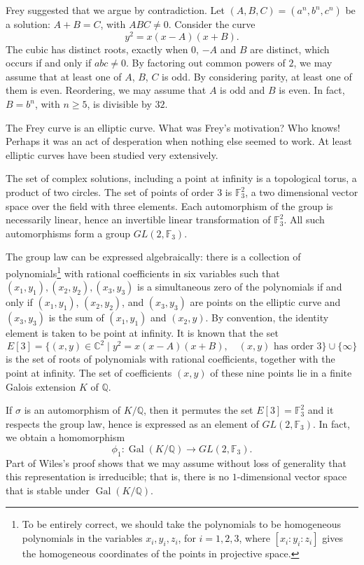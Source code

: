 \documentclass{amsart}
\def\op#1{{\operatorname{#1}}}
\newcommand{\ring}[1]{\mathbb{#1}}
\begin{document}
Frey suggested that we argue by contradiction.  Let
$(A,B,C)=(a^n,b^n,c^n)$ be a solution: $A+B=C$, with $ABC\ne
0$. Consider the curve
\[
y^2 = x (x - A) (x + B).
\]
The cubic has distinct roots, exactly when $0$, $-A$ and $B$ are
distinct, which occurs if and only if $abc\ne 0$.  By factoring out
common powers of $2$, we may assume that at least one of $A$, $B$, $C$
is odd.  By considering parity, at least one of them is even.
Reordering, we may assume that $A$ is odd and $B$ is even.  In fact,
$B=b^n$, with $n\ge 5$, is divisible by $32$.


The Frey curve is an elliptic curve.  What was Frey's motivation?  Who
knows! Perhaps it was an act of desperation when nothing else seemed
to work. At least elliptic curves have been studied very extensively.

The set of complex solutions, including a point at infinity is a
topological torus, a product of two circles.  The set of points of
order $3$ is $\ring{F}_3^2$, a two dimensional vector space over the
field with three elements.  Each automorphism of the group is
necessarily linear, hence an invertible linear transformation of
$\ring{F}^2_3$.  All such automorphisms form a group
$GL(2,\ring{F}_3)$.

The group law can be expressed algebraically: there is a collection of
polynomials\footnote{To be entirely correct, we should take the
  polynomials to be homogeneous polynomials in the variables
  $x_i,y_i,z_i$, for $i=1,2,3$, where $[x_i:y_i:z_i]$ gives the
  homogeneous coordinates of the points in projective space.}  with
rational coefficients in six variables such that
$(x_1,y_1),(x_2,y_2),(x_3,y_3)$ is a simultaneous zero of the
polynomials if and only if $(x_1,y_1)$, $(x_2,y_2)$, and $(x_3,y_3)$
are points on the elliptic curve and $(x_3,y_3)$ is the sum of
$(x_1,y_1)$ and $(x_2,y)$.  By convention, the identity element is
taken to be point at infinity.  It is known that the set
\[
E[3]= \{(x,y) \in \ring{C}^2\mid y^2 = x (x-A) (x+B), 
\quad (x,y) \text{ has order } 3\}\cup \{\infty\}
\]
is the set of roots of polynomials with rational coefficients,
together with the point at infinity.  The set of coefficients $(x,y)$
of these nine points lie in a finite Galois extension $K$ of
$\ring{Q}$.

If $\sigma$ is an automorphism of $K/\ring{Q}$, then it permutes the
set $E[3]=\ring{F}_3^2$ and it respects the group law, hence is
expressed as an element of $GL(2,\ring{F}_3)$.  In fact, we obtain a
homomorphism
\[
\phi_1 : \op{Gal}(K/\ring{Q}) \to GL(2,\ring{F}_3).
\]
Part of Wiles's proof shows that we may assume without loss of
generality that this representation is irreducible; that is, there is
no $1$-dimensional vector space that is stable under
$\op{Gal}(K/\ring{Q})$.
\end{document}
